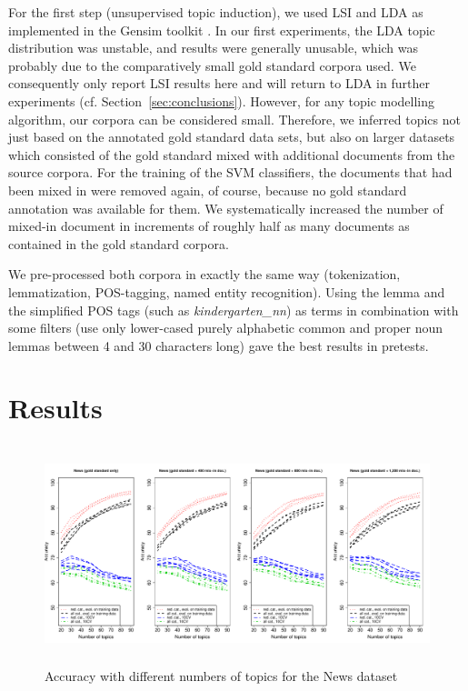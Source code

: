 \documentclass[11pt]{article}
\begin{document}
For the first step (unsupervised topic induction), we used LSI and LDA as implemented in the Gensim toolkit \cite{RehurekSojka2010}.
In our first experiments, the LDA topic distribution was unstable, and results were generally unusable, which was probably due to the comparatively small gold standard corpora used.
We consequently only report LSI results here and will return to LDA in further experiments (cf. Section~\ref{sec:conclusions}).
However, for any topic modelling algorithm, our corpora can be considered small.
Therefore, we inferred topics not just based on the annotated gold standard data sets, but also on larger datasets which consisted of the gold standard mixed with additional documents from the source corpora.
For the training of the SVM classifiers, the documents that had been mixed in were removed again, of course, because no gold standard annotation was available for them.
We systematically increased the number of mixed-in document in increments of roughly half as many documents as contained in the gold standard corpora.

We pre-processed both corpora in exactly the same way (tokenization, lemmatization, POS-tagging, named entity recognition).
Using the lemma and the simplified POS tags (such as \textit{kindergarten\_nn}) as terms in combination with some filters (use only lower-cased purely alphabetic common and proper noun lemmas between 4 and 30 characters long) gave the best results in pretests.

\section{Results}
\label{sec:results}

\begin{figure}[!ht]
  \centering
  \includegraphics[width=\textwidth, height=6.4cm]{graphics/dereko.pdf}
  \caption{Accuracy with different numbers of topics for the News dataset}
  \label{fig:dereko}
\end{figure}
\end{document}
